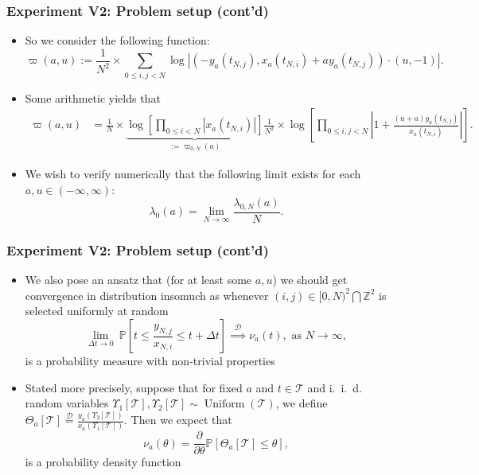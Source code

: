 \documentclass[usenames,svgnames,dvipsnames,10pt]{beamer}
\begin{document}
\begin{frame}
\frametitle{Experiment V2: Problem setup (cont'd)}

\begin{itemize}

\item So we consider the following function: 
      \[
      \varpi(a, u) := \frac{1}{N^2} \times \sum_{0 \leq i, j < N} \log\left\lvert 
          (-y_a(t_{N,j}), x_a(t_{N,i})+ay_a(t_{N,j})) \cdot (u, -1)\right\rvert. 
      \]
\item Some arithmetic yields that 
     {\small
      \begin{align*}
      \varpi(a, u) & = \frac{1}{N} \times 
           \underset{ := \varpi_{0,N}(a)}{\underbrace{\log\left[\prod_{0 \leq i < N} |x_a(t_{N,i})|\right]}} 
           \frac{1}{N^2} \times \log\left[\prod_{0 \leq i,j < N} \left\lvert 1 + 
           \frac{(u+a)y_a(t_{N,j})}{x_a(t_{N,i})}\right\rvert\right]. 
      \end{align*}
      }
\item We wish to verify numerically that the following limit exists for each $a, u \in (-\infty, \infty)$:  
      \[
      \lambda_0(a) = \lim_{N \rightarrow \infty} \frac{\lambda_{0,N}(a)}{N}. 
      \]

\end{itemize}

\end{frame}

\begin{frame}
\frametitle{Experiment V2: Problem setup (cont'd)}

\begin{itemize}

\item We also pose an ansatz that (for at least some $a,u$) we should get 
      convergence in distribution insomuch as 
      whenever $(i, j) \in [0, N)^2 \bigcap \mathbb{Z}^2$ is selected uniformly at random 
      \[
      \lim_{\Delta t \rightarrow 0}\ \mathbb{P}\left[t \leq \frac{y_{N,j}}{x_{N,i}} \leq t + \Delta t\right] 
           \overset{\mathscr{D}}{\implies} \nu_a(t), \text{ as } N \rightarrow \infty, 
      \]
      is a probability measure with non-trivial properties 
\item Stated more precisely, suppose that for fixed $a$ and $t \in \mathcal{T}$ and 
      i.~i.~d.~ random variables 
      $\Upsilon_1[\mathcal{T}], \Upsilon_2[\mathcal{T}] \sim \operatorname{Uniform}(\mathcal{T})$, we define 
      $\Theta_a[\mathcal{T}] \overset{\mathscr{D}}{=} \frac{y_a(\Upsilon_2[\mathcal{T}])}{x_a(\Upsilon_1[\mathcal{T}])}$. 
      Then we expect that 
      \[
      \nu_a(\theta) = \frac{\partial}{\partial \theta} \mathbb{P}\left[\Theta_a[\mathcal{T}] \leq \theta\right], 
      \]
      is a probability density function 
      
\end{itemize} 

\end{frame}
\end{document}
